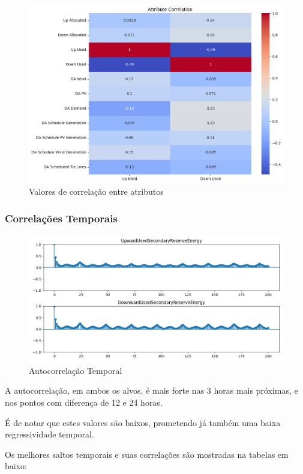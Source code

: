 \begin{figure}[H]
  \centering
  \includegraphics[width=\textwidth]{plots/correlation_heatmap.png}
  \caption{Valores de correlação entre atributos}
  \label{fig:correlationheatmap}
\end{figure}

\subsubsection{Correlações Temporais}

\begin{figure}[H]
  \centering
  \includegraphics[width=\textwidth]{plots/autocorrelation.png}
  \caption{Autocorrelação Temporal}
  \label{fig:autocorrelation}
\end{figure}

A autocorrelação, em ambos os alvos, é mais forte nas 3 horas mais próximas, e nos pontos com diferença de 12 e 24 horas.\par
É de notar que estes valores são baixos, prometendo já também uma baixa regressividade temporal.\par
Os melhores saltos temporais e suas correlações são mostradas na tabelas em baixo:\\


